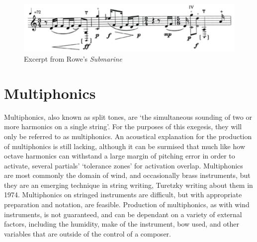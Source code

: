 \begin{figure}
  \includegraphics[width=\linewidth]{./resources/roweALFExcerpt.pdf}
  \caption{Excerpt from Rowe's \emph{Submarine}}
\label{fig:Excerpt from Rowe's Submarine}
\end{figure}





\newpage
\section{Multiphonics} \label{sec:multiphonicsDiscussion}

Multiphonics, also known as split tones, are `the simultaneous sounding of two or more harmonics on a single string'.\autocites[108]{fallowfieldCelloMapHandbook2009}[http://www.cellomap.com/index/the-string/the-left-hand.html]{fallowfieldCelloMap}
For the purposes of this exegesis, they will only be referred to as multiphonics.
An acoustical explanation for the production of multiphonics is still lacking, although it can be surmised that much like how octave harmonics can withstand a large margin of pitching error in order to activate, several partials' `tolerance zones' for activation overlap.\autocites[146]{fallowfieldCelloMapHandbook2009}{bloggsFeedbackContrabassSession2019}
Multiphonics are most commonly the domain of wind, and occasionally brass instruments, but they are an emerging technique in string writing, Turetzky writing about them in 1974.\autocite[138]{turetzkyContemporaryContrabass1974}
Multiphonics on stringed instruments are difficult, but with appropriate preparation and notation, are feasible. 
Production of multiphonics, as with wind instruments, is not guaranteed, and can be dependant on a variety of external factors, including the humidity, make of the instrument, bow used, and other variables that are outside of the control of a composer. 
 


